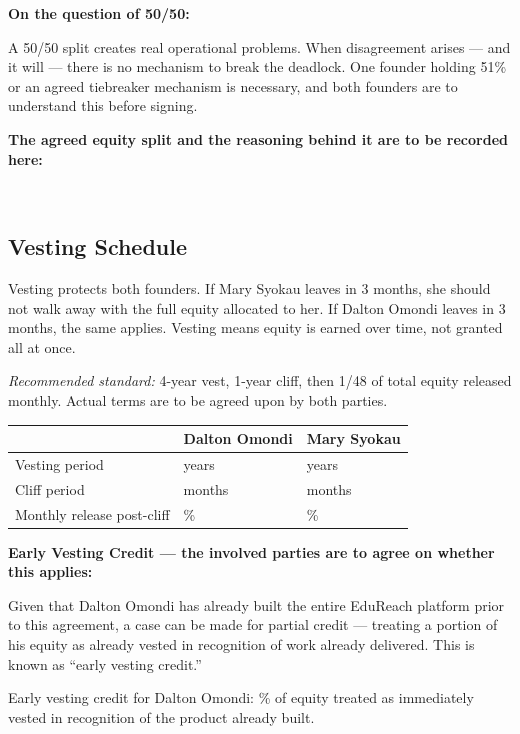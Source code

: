 \documentclass[12pt,a4paper]{article}
\newcommand{\blank}[1][5.5cm]{\underline{\hspace{#1}}}
\begin{document}
\medskip
\noindent\textbf{On the question of 50/50:}

A 50/50 split creates real operational problems. When disagreement arises --- and it will --- there is no mechanism to break the deadlock. One founder holding 51\% or an agreed tiebreaker mechanism is necessary, and both founders are to understand this before signing.

\medskip
\noindent\textbf{The agreed equity split and the reasoning behind it are to be recorded here:}

\noindent\blank[14cm]\\[0.5em]
\noindent\blank[14cm]

\subsection{Vesting Schedule}

Vesting protects both founders. If Mary Syokau leaves in 3 months, she should not walk away with the full equity allocated to her. If Dalton Omondi leaves in 3 months, the same applies. Vesting means equity is earned over time, not granted all at once.

\textit{Recommended standard:} 4-year vest, 1-year cliff, then 1/48 of total equity released monthly. Actual terms are to be agreed upon by both parties.

\begin{tabularx}{\linewidth}{L{5cm} C{4cm} C{4cm}}
  \toprule
  & \textbf{Dalton Omondi} & \textbf{Mary Syokau} \\
  \midrule
  Vesting period             & \blank[2.5cm] years & \blank[2.5cm] years \\[0.4em]
  Cliff period               & \blank[2.5cm] months & \blank[2.5cm] months \\[0.4em]
  Monthly release post-cliff & \blank[2.5cm]\% & \blank[2.5cm]\% \\
  \bottomrule
\end{tabularx}

\medskip
\noindent\textbf{Early Vesting Credit --- the involved parties are to agree on whether this applies:}

Given that Dalton Omondi has already built the entire EduReach platform prior to this agreement, a case can be made for partial credit --- treating a portion of his equity as already vested in recognition of work already delivered. This is known as ``early vesting credit.''

\medskip
\noindent Early vesting credit for Dalton Omondi: \blank[2cm]\% of equity treated as immediately vested in recognition of the product already built.
\end{document}

